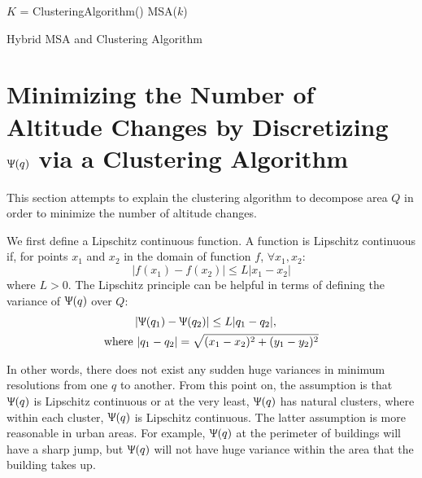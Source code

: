 \documentclass[conference]{IEEEtran}
\theoremstyle{plain}%
\begin{document}
\begin{algorithm}
\begin{algorithmic}[1]
\STATE $K$ = ClusteringAlgorithm() 
\STATE MSA($k$) 
\ENDFOR
\end{algorithmic}
\caption{Hybrid MSA and Clustering Algorithm} 
\label{alg:HybridMSACluster}
\end{algorithm}


\section{Minimizing the Number of Altitude Changes by Discretizing $\Uppsi(q)$ via a Clustering Algorithm} \label{clustering}
This section attempts to explain the clustering algorithm to decompose area $Q$ in order to minimize the number of altitude changes.

We first define a Lipschitz continuous function. A function is Lipschitz continuous if, for points $x_1$ and $x_2$ in the domain of function $f$, $\forall x_1, x_2$:
\begin{equation*}
\lvert f(x_1)-f(x_2)\rvert \leq L \lvert x_1-x_2\rvert
\end{equation*}
where $L>0$. The Lipschitz principle can be helpful in terms of defining the variance of $\Uppsi(q)$ over $Q$:
\begin{multline}
\lvert \Uppsi(q_1)-\Uppsi(q_2)\rvert \leq L \lvert q_1-q_2\rvert, \quad \\
\text{where } \lvert q_1-q_2\rvert = \sqrt{(x_1-x_2)^2 + (y_1-y_2)^2}
\end{multline}

In other words, there does not exist any sudden huge variances in minimum resolutions from one $q$ to another. From this point on, the assumption is that $\Uppsi(q)$ is Lipschitz continuous or at the very least, $\Uppsi(q)$ has natural clusters, where within each cluster, $\Uppsi(q)$ is Lipschitz continuous. The latter assumption is more reasonable in urban areas. For example, $\Uppsi(q)$ at the perimeter of buildings will have a sharp jump, but $\Uppsi(q)$ will not have huge variance within the area that the building takes up.
\end{document}
